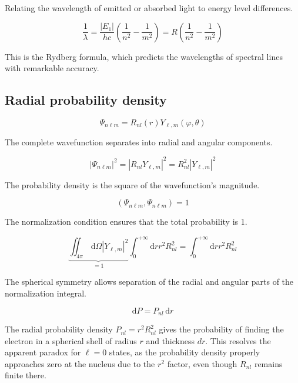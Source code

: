 \documentclass[italian]{HKNdocument}
\begin{document}
Relating the wavelength of emitted or absorbed light to energy level differences.

\begin{equation}
\frac{1}{\lambda}=\frac{\left|E_{1}\right|}{h c}\left(\frac{1}{n^{2}}-\frac{1}{m^{2}}\right)=R\left(\frac{1}{n^{2}}-\frac{1}{m^{2}}\right)
\end{equation}

This is the Rydberg formula, which predicts the wavelengths of spectral lines with remarkable accuracy.

\subsection{Radial probability density}

\begin{equation}
\Psi_{n \ell m}=R_{n l}(r) Y_{\ell, m}(\varphi, \theta)
\end{equation}

The complete wavefunction separates into radial and angular components.

\begin{equation}
\left|\Psi_{n \ell m}\right|^{2}=\left|R_{n l} Y_{\ell, m}\right|^{2}=R_{n l}^{2}\left|Y_{\ell, m}\right|^{2}
\end{equation}

The probability density is the square of the wavefunction's magnitude.

\begin{equation}
\left(\Psi_{n \ell m}, \Psi_{n \ell m}\right)=1
\end{equation}

The normalization condition ensures that the total probability is 1.

\begin{equation}
\underbrace{\iint_{4 \pi} \, \mathrm{d} \Omega\left|Y_{\ell, m}\right|^{2}}_{=1} \int_{0}^{+\infty} \mathrm{d} r r^{2} R_{n l}^{2}=\int_{0}^{+\infty} \mathrm{d} r r^{2} R_{n l}^{2}
\end{equation}

The spherical symmetry allows separation of the radial and angular parts of the normalization integral.

\begin{equation}
\mathrm{d} P=P_{n l} \, \mathrm{d} r
\end{equation}

The radial probability density $P_{nl} = r^2 R_{nl}^2$ gives the probability of finding the electron in a spherical shell of radius $r$ and thickness $dr$. This resolves the apparent paradox for $\ell=0$ states, as the probability density properly approaches zero at the nucleus due to the $r^2$ factor, even though $R_{nl}$ remains finite there.
\end{document}
